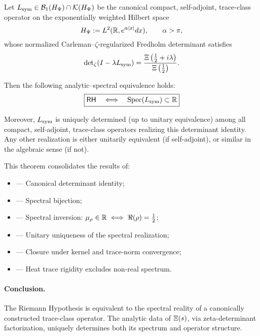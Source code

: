 \begin{theorem}
\label{thm:rh_spectral_closure}

Let \( L_{\mathrm{sym}} \in \mathcal{B}_1(H_{\Psi}) \cap \mathcal{K}(H_{\Psi}) \) be the canonical compact, self-adjoint, trace-class operator on the exponentially weighted Hilbert space
\[
H_{\Psi} := L^2(\mathbb{R}, e^{\alpha |x|} dx), \qquad \alpha > \pi,
\]
whose normalized Carleman–\(\zeta\)-regularized Fredholm determinant satisfies
\[
\det\nolimits_\zeta(I - \lambda L_{\mathrm{sym}}) = \frac{\Xi\left(\tfrac{1}{2} + i\lambda\right)}{\Xi\left(\tfrac{1}{2}\right)}.
\]

Then the following analytic–spectral equivalence holds:
\[
\boxed{
\mathsf{RH} \quad \Longleftrightarrow \quad \operatorname{Spec}(L_{\mathrm{sym}}) \subset \mathbb{R}
}
\]

\noindent
Moreover, \( L_{\mathrm{sym}} \) is uniquely determined (up to unitary equivalence) among all compact, self-adjoint, trace-class operators realizing this determinant identity. Any other realization is either unitarily equivalent (if self-adjoint), or similar in the algebraic sense (if not).

\medskip

\noindent
This theorem consolidates the results of:
\begin{itemize}
  \item {} — Canonical determinant identity;
  \item {} — Spectral bijection;
  \item {} — Spectral inversion: \(\mu_\rho \in \mathbb{R} \iff \Re(\rho) = \tfrac{1}{2}\);
  \item {} — Unitary uniqueness of the spectral realization;
  \item {} — Closure under kernel and trace-norm convergence;
  \item {} — Heat trace rigidity excludes non-real spectrum.
\end{itemize}

\paragraph{Conclusion.}
The Riemann Hypothesis is equivalent to the spectral reality of a canonically constructed trace-class operator. The analytic data of \( \Xi(s) \), via zeta-determinant factorization, uniquely determines both its spectrum and operator structure.
\end{theorem}
